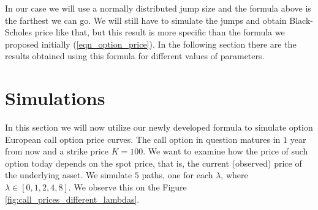 \documentclass[times, utf8, diplomski]{fer}
\begin{document}
In our case we will use a normally distributed jump size and the formula above is the farthest we can go. We will still have to simulate the jumps and obtain Black-Scholes price like that, but this result is more specific than the formula we proposed initially (\ref{eqn_option_price}). In the following section there are the results obtained using this formula for different values of parameters.


\section{Simulations}


In this section we will now utilize our newly developed formula to simulate option European call option price curves. The call option in question matures in $1$ year from now and a strike price $K=100$. We want to examine how the price of such option today depends on the spot price, that is, the current (observed) price of the underlying asset. We simulate $5$ paths, one for each $\lambda$, where $\lambda \in [0,1,2,4,8]$. We observe this on the Figure \ref{fig:call_prices_different_lambdas}.
\end{document}

